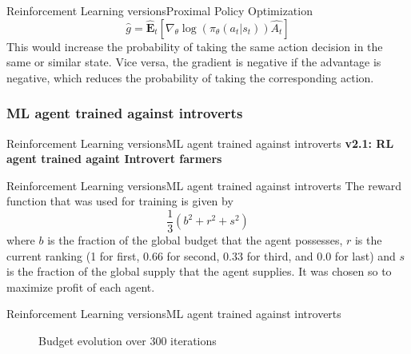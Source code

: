 \documentclass[10pt, aspectratio=169]{beamer}
\def\ab{Reinforcement Learning versions}
\def\abb{Proximal Policy Optimization}
\def\abc{ML agent trained against introverts}
\begin{document}
\begin{frame}{\ab}{\abb}
\begin{equation}
  \hat{g} = \hat{\mathbf{E}}_t \left[ \nabla_{\theta} \log(\pi_{\theta}(a_t|s_t)) \hat{A_t} \right]
\end{equation}
This would increase the probability of taking the same action decision in the same or similar state. Vice versa, the gradient is negative if the advantage is negative, which reduces the probability of taking the corresponding action.
\end{frame}


\subsubsection{\abc}

\begin{frame}{\ab}{\abc}
  \centering
  \textbf{v2.1: RL agent trained againt Introvert farmers}
\end{frame}

\begin{frame}{\ab}{\abc}
  The reward function that was used for training is given by
\begin{equation}
    \frac{1}{3}(b^2 + r^2 + s^2)
\end{equation}
where $b$ is the fraction of the global budget that the agent possesses, $r$ is the current ranking (1 for first, $0.66$ for second, $0.33$ for third, and
$0.0$ for last) and $s$ is the fraction of the global supply that the agent
supplies. It was chosen so to maximize profit of each agent.
\end{frame}


\begin{frame}{\ab}{\abc}
\begin{figure}[H]
    \centering
    \caption{Budget evolution over 300 iterations}
    \label{fig:budget MLvsIntros}
\end{figure}
\end{frame}
\end{document}
